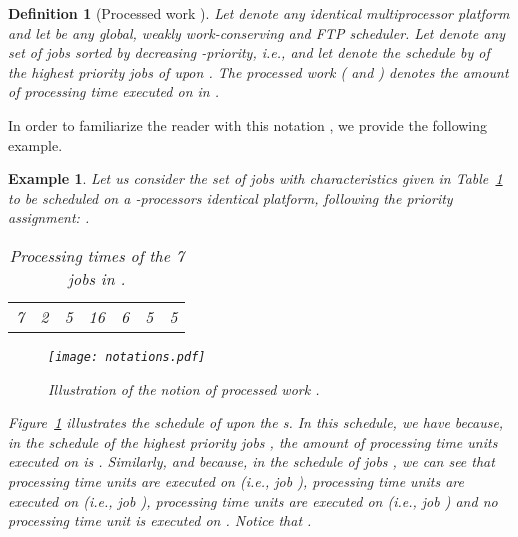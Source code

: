 \documentclass{article}
\newtheorem{Definition}{Definition}
\newtheorem{validity test}{Validity Test}
\newtheorem{Example}{Example}
\begin{document}
\begin{Definition}[Processed work ]
\label{def:Multimode:processed_work}
Let  denote any identical multiprocessor platform and let  be any global, weakly work-conserving and FTP scheduler. Let  denote any set of  jobs sorted by decreasing -priority, i.e.,  and let  denote the schedule by  of the  highest priority jobs of  upon . The processed work  ( and ) denotes the amount of processing time executed on   in .
\end{Definition}

In order to familiarize the reader with this notation , we provide the following example.

\begin{Example}
Let us consider the set  of  jobs with characteristics given in Table~\ref{tab:Multimode:tight_upper_bound_example2} to be scheduled on a -processors identical platform, following the priority assignment: . 
\begin{table}[h!]
\begin{center}
\begin{tabular}{| c | c | c | c | c | c | c |}
\hline
 &  &  &  &  &  &   \\
\hline
7 & 2 & 5 & 16 & 6 & 5 & 5 \\
\hline
\end{tabular}
\end{center}
\caption{Processing times of the 7 jobs in .}
\label{tab:Multimode:tight_upper_bound_example2}
\end{table}

\begin{figure}[!h]
\begin{center}
\texttt{[image: notations.pdf]}
\caption{Illustration of the notion of processed work .}
\label{fig:MM_proofs_ident_notations}
\end{center}
\end{figure}

Figure~\ref{fig:MM_proofs_ident_notations} illustrates the schedule of  upon the  s. In this schedule, we have  because, in the schedule  of the  highest priority jobs , the amount of processing time units executed on  is . Similarly,  and  because, in the schedule  of jobs , we can see that  processing time units are executed on  (i.e., job ),  processing time units are executed on  (i.e., job ),  processing time units are executed on  (i.e., job ) and no processing time unit is executed on . Notice that  . 
\end{Example}
\end{document}
